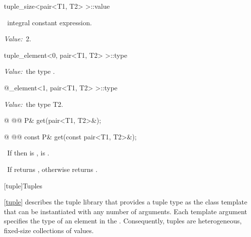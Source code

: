 \documentclass[american,twoside]{book}
\begin{document}
%
\begin{itemdecl}
tuple_size<pair<T1, T2> >::value
\end{itemdecl}
\begin{itemdescr}
\pnum\returns\ integral constant expression.

\pnum\textit{Value:}\ 2.
\end{itemdescr}

%
\begin{itemdecl}
tuple_element<0, pair<T1, T2> >::type
\end{itemdecl}
\begin{itemdescr}
\pnum\textit{Value:}\ the type .
\end{itemdescr}

%
\begin{itemdecl}
@\ptr@tuple_element<1, pair<T1, T2> >::type
\end{itemdecl}
\begin{itemdescr}
\pnum\textit{Value:}\ the type T2.
\end{itemdescr}

%
%
\begin{itemdecl}
@
  @@
  P& get(pair<T1, T2>&);

@
  @@
  const P& get(const pair<T1, T2>&);
\end{itemdecl}
\begin{itemdescr}
\pnum\returntype\ If  then  is ,   is .

\pnum\returns\ If  returns , otherwise
  returns .
\end{itemdescr}

[tuple]{Tuples}

\pnum
{}%
\ref{tuple} describes the tuple library that provides a tuple type as
the class template  that can be instantiated with any number
of arguments. Each template argument specifies
the type of an element in the .  Consequently, tuples are
heterogeneous, fixed-size collections of values.
\end{document}
